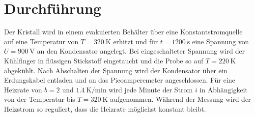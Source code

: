 \section{Durchführung}
\label{sec:Durchführung}

Der Kristall wird in einem evakuierten Behälter über eine Konstantstromquelle auf eine Temperatur von $T=\SI{320}{\kelvin}$ erhitzt und für $t=\SI{1200}{\second}$ eine Spannung von $U=\SI{900}{\volt}$ an den Kondensator angelegt.
Bei eingeschalteter Spannung wird der Kühlfinger in flüssigen Stickstoff eingetaucht und die Probe so auf $T=\SI{220}{\kelvin}$ abgekühlt.
Nach Abschalten der Spannung wird der Kondensator über ein Erdungskabel entladen und an das Picoamperemeter angeschlossen.
Für eine Heizrate von $b=2$ und $\SI{1,4}{\kelvin\per\minute}$ wird jede Minute der Strom $i$ in Abhängigkeit von der Temperatur bis $T=\SI{320}{\kelvin}$ aufgenommen.
Während der Messung wird der Heizstrom so reguliert, dass die Heizrate möglichst konstant bleibt.
